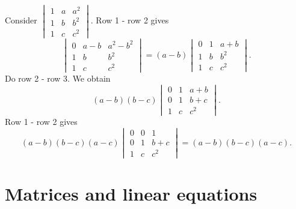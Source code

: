 \documentclass[a4paper]{article}
\begin{document}
\begin{eg}
  Consider $\begin{vmatrix}1 & a & a^2\\1 & b & b^2\\1 & c & c^2 \end{vmatrix}$. Row 1 - row 2 gives
  \[
    \begin{vmatrix}0 & a - b & a^2 - b^2\\1 & b & b^2\\1 & c & c^2 \end{vmatrix} = (a - b)\begin{vmatrix}0 & 1 & a + b\\1 & b & b^2\\1 & c & c^2 \end{vmatrix}.
  \]
  Do row 2 - row 3. We obtain
  \[
    (a - b)(b - c)\begin{vmatrix}0 & 1 & a + b\\0 & 1 & b + c\\1 & c & c^2 \end{vmatrix}.
  \]
  Row 1 - row 2 gives
  \[
    (a - b)(b - c)(a - c)\begin{vmatrix}0 & 0 & 1\\0 & 1 & b + c\\1 & c & c^2 \end{vmatrix} = (a - b)(b - c)(a - c).
  \]
\end{eg}

\section{Matrices and linear equations}
\end{document}
